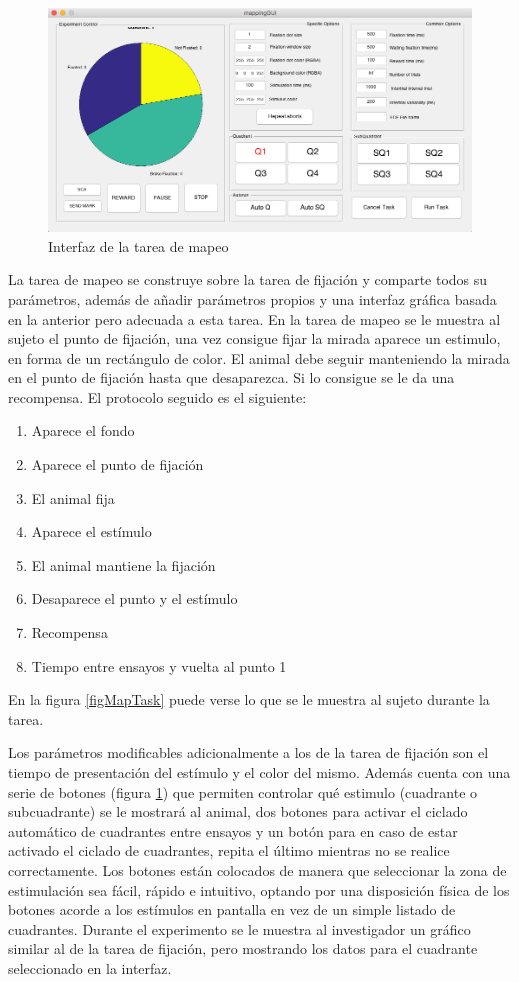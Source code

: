\documentclass[conference]{IEEEtran}
\begin{document}
\begin{figure}[htbp]
\centerline{\includegraphics[width=\linewidth]{figures/mapping_gui}}
\caption{Interfaz de la tarea de mapeo}
\label{figmappingGUI}
\end{figure}

La tarea de mapeo se construye sobre la tarea de fijación y comparte todos su parámetros, además de añadir parámetros propios y una interfaz gráfica basada en la anterior pero adecuada a esta tarea.
En la tarea de mapeo se le muestra al sujeto el punto de fijación, una vez consigue fijar la mirada aparece un estimulo, en forma de un rectángulo de color. El animal debe seguir manteniendo la mirada en el punto de fijación hasta que desaparezca. Si lo consigue se le da una recompensa.
El protocolo seguido es el siguiente:

\begin{enumerate}
	\item Aparece el fondo
	\item Aparece el punto de fijación
	\item El animal fija
	\item Aparece el estímulo
	\item El animal mantiene la fijación
	\item Desaparece el punto y el estímulo
	\item Recompensa
	\item Tiempo entre ensayos y vuelta al punto 1
\end{enumerate}


En la figura \ref{figMapTask} puede verse lo que se le muestra al sujeto durante la tarea. 



Los parámetros modificables adicionalmente a los de la tarea de fijación son el tiempo de presentación del estímulo y el color del mismo. Además cuenta con una serie de botones (figura \ref{figmappingGUI}) que permiten controlar qué estimulo (cuadrante o subcuadrante) se le mostrará al animal, dos botones para activar el ciclado automático de cuadrantes entre ensayos y un botón para en caso de estar activado el ciclado de cuadrantes, repita el último mientras no se realice correctamente.
Los botones están colocados de manera que seleccionar la zona de estimulación sea fácil, rápido e intuitivo, optando por una disposición física de los botones acorde a los estímulos en pantalla en vez de un simple listado de cuadrantes.
Durante el experimento se le muestra al investigador un gráfico similar al de la tarea de fijación, pero mostrando los datos para el cuadrante seleccionado en la interfaz.
\end{document}
